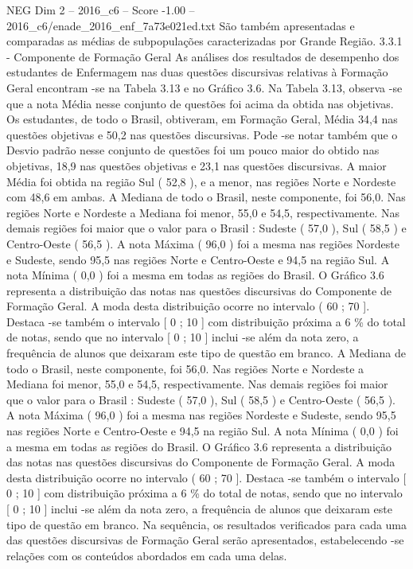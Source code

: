 \begin{textsample}{NEG Dim 2 – 2016\_c6 – Score -1.00 – 2016\_c6/enade\_2016\_enf\_7a73e021ed.txt}
São também apresentadas e comparadas as médias de subpopulações caracterizadas por Grande Região. 3.3.1 - Componente de Formação Geral As análises dos resultados de desempenho dos estudantes de Enfermagem nas duas questões discursivas relativas à Formação Geral encontram -se na Tabela 3.13 e no Gráfico 3.6.
Na Tabela 3.13, observa -se que a nota Média nesse conjunto de questões foi acima da obtida nas objetivas.
Os estudantes, de todo o Brasil, obtiveram, em Formação Geral, Média 34,4 nas questões objetivas e 50,2 nas questões discursivas.
Pode -se notar também que o Desvio padrão nesse conjunto de questões foi um pouco maior do obtido nas objetivas, 18,9 nas questões objetivas e 23,1 nas questões discursivas.
A maior Média foi obtida na região Sul ( 52,8 ), e a menor, nas regiões Norte e Nordeste com 48,6 em ambas.
A Mediana de todo o Brasil, neste componente, foi 56,0.
Nas regiões Norte e Nordeste a Mediana foi menor, 55,0 e 54,5, respectivamente.
Nas demais regiões foi maior que o valor para o Brasil : Sudeste ( 57,0 ), Sul ( 58,5 ) e Centro-Oeste ( 56,5 ).
A nota Máxima ( 96,0 ) foi a mesma nas regiões Nordeste e Sudeste, sendo 95,5 nas regiões Norte e Centro-Oeste e 94,5 na região Sul.
A nota Mínima ( 0,0 ) foi a mesma em todas as regiões do Brasil.
O Gráfico 3.6 representa a distribuição das notas nas questões discursivas do Componente de Formação Geral.
A moda desta distribuição ocorre no intervalo ( 60 ; 70 ].
Destaca -se também o intervalo [ 0 ; 10 ] com distribuição próxima a 6 \% do total de notas, sendo que no intervalo [ 0 ; 10 ] inclui -se além da nota zero, a frequência de alunos que deixaram este tipo de questão em branco.
A Mediana de todo o Brasil, neste componente, foi 56,0.
Nas regiões Norte e Nordeste a Mediana foi menor, 55,0 e 54,5, respectivamente.
Nas demais regiões foi maior que o valor para o Brasil : Sudeste ( 57,0 ), Sul ( 58,5 ) e Centro-Oeste ( 56,5 ).
A nota Máxima ( 96,0 ) foi a mesma nas regiões Nordeste e Sudeste, sendo 95,5 nas regiões Norte e Centro-Oeste e 94,5 na região Sul.
A nota Mínima ( 0,0 ) foi a mesma em todas as regiões do Brasil.
O Gráfico 3.6 representa a distribuição das notas nas questões discursivas do Componente de Formação Geral.
A moda desta distribuição ocorre no intervalo ( 60 ; 70 ].
Destaca -se também o intervalo [ 0 ; 10 ] com distribuição próxima a 6 \% do total de notas, sendo que no intervalo [ 0 ; 10 ] inclui -se além da nota zero, a frequência de alunos que deixaram este tipo de questão em branco.
Na sequência, os resultados verificados para cada uma das questões discursivas de Formação Geral serão apresentados, estabelecendo -se relações com os conteúdos abordados em cada uma delas.

\end{textsample}
